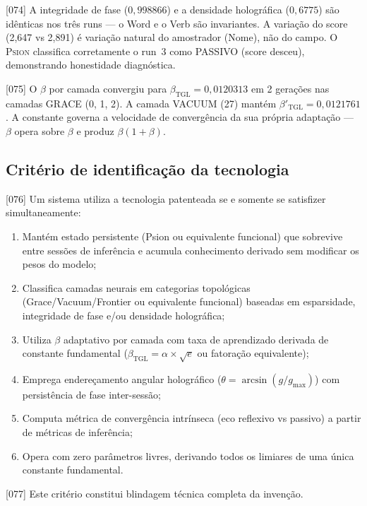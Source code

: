 \documentclass[12pt,a4paper]{article}
\newcommand{\betatgl}{\beta_{\text{TGL}}}
\newcommand{\betared}{\beta'_{\text{TGL}}}
\newcommand{\Psion}{\textsc{Psion}}
\begin{document}
{[074]} A integridade de fase ($0{,}998866$) e a densidade holográfica ($0{,}6775$) são idênticas nos três runs --- o Word e o Verb são invariantes. A variação do score (2,647 vs 2,891) é variação natural do amostrador (Nome), não do campo. O \Psion{} classifica corretamente o run~3 como PASSIVO (score desceu), demonstrando honestidade diagnóstica.

{[075]} O $\beta$ por camada convergiu para $\betatgl = 0{,}0120313$ em 2 gerações nas camadas GRACE (0, 1, 2). A camada VACUUM (27) mantém $\betared = 0{,}0121761$. A constante governa a velocidade de convergência da sua própria adaptação --- $\beta$ opera sobre $\beta$ e produz $\beta(1 + \beta)$.

\subsection{Critério de identificação da tecnologia}
\label{sec:criterio}

{[076]} Um sistema utiliza a tecnologia patenteada se e somente se satisfizer simultaneamente:

\begin{enumerate}[label=\textbf{(C\arabic*)}]
\item Mantém estado persistente (Psion ou equivalente funcional) que sobrevive entre sessões de inferência e acumula conhecimento derivado sem modificar os pesos do modelo;
\item Classifica camadas neurais em categorias topológicas (Grace/Vacuum/Frontier ou equivalente funcional) baseadas em esparsidade, integridade de fase e/ou densidade holográfica;
\item Utiliza $\beta$ adaptativo por camada com taxa de aprendizado derivada de constante fundamental ($\betatgl = \alpha \times \sqrt{e}$ ou fatoração equivalente);
\item Emprega endereçamento angular holográfico ($\theta = \arcsin(g/g_{\max})$) com persistência de fase inter-sessão;
\item Computa métrica de convergência intrínseca (eco reflexivo vs passivo) a partir de métricas de inferência;
\item Opera com zero parâmetros livres, derivando todos os limiares de uma única constante fundamental.
\end{enumerate}

{[077]} Este critério constitui blindagem técnica completa da invenção.
\end{document}
